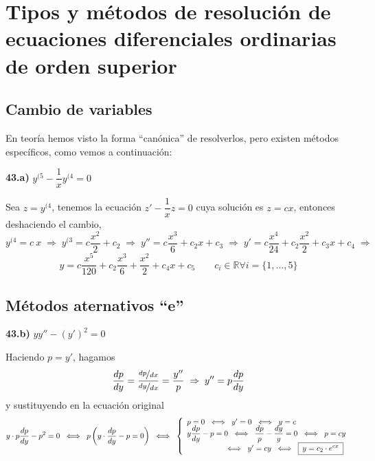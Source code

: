 \chapter{Tipos y métodos de resolución de ecuaciones diferenciales ordinarias de orden superior}
\section{Cambio de variables}
En teoría hemos visto la forma ``canónica'' de resolverlos, pero existen métodos específicos, como vemos a continuación:
\begin{ejer}
    \textbf{43.a)} $y^{(5}-\dfrac{1}{x} y^{(4}=0$
\end{ejer}
\begin{sol}
    Sea $z=y^{(4}$, tenemos la ecuación $z'-\dfrac{1}{x}z=0$ cuya solución es $z=cx$, entonces deshaciendo el cambio, 
    $$y^{(4}=c \: x \; \Rightarrow \; y^{(3}=c \dfrac{x^2}{2}+c_2 \; \Rightarrow \; y''=c \dfrac{x^3}{6}+c_2x+c_3 \; \Rightarrow \; y'=c \dfrac{x^4}{24}+c_2 \dfrac{x^2}{2}+c_3x+c_4 \; \Rightarrow \;$$
    $$ y=c \dfrac{x^5}{120} + c_2 \dfrac{x^3}{6}+\dfrac{x^2}{2}+c_4x+c_5 \qquad c_i \in \mathbb R \forall i = \{1, \ldots, 5\}$$
\end{sol}
\section{Métodos aternativos ``e''}
\begin{ejer}
    \textbf{43.b)} $yy''-(y')^2=0$
\end{ejer}
\begin{sol}
    Haciendo $p=y'$, hagamos 
    $$\dfrac{dp}{dy}=\dfrac{\nicefrac{dp}{dx}}{\nicefrac{dy}{dx}}=\dfrac{y''}{p} \; \Rightarrow \; y''=p \dfrac{dp}{dy}$$
y sustituyendo en la ecuación original
$$y \cdot p \dfrac{dp}{dy}-p^2=0  \; \iff \; p\left( y \cdot \dfrac{dp}{dy}-p=0\right) \; \iff \; \left\{ \begin{array}{l}
     p = 0 \; \iff \; y'=0 \; \iff \; y=c  \\
     \vspace{-5mm} \\
     y \dfrac{dp}{dy}-p=0 \; \iff \; \dfrac{dp}{p}-\dfrac{dy}{y}=0 \; \iff \; p=cy  \\
     \qquad \qquad \quad \iff \; y'=cy \; \iff \; \boxed{ \: y=c_2\cdot e^{cx} \: }
\end{array}\right.$$
\end{sol}
